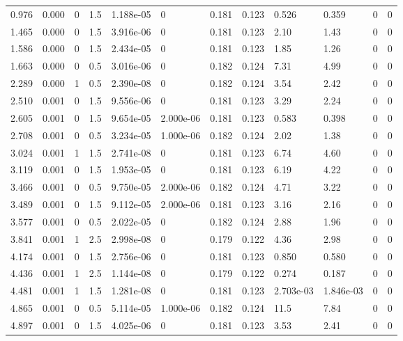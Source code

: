 \documentclass[preview]{standalone}
\begin{document}
{{\begin{tabular}{L{1.2cm}C{1.2cm} C{0.3cm}C{0.5cm} C{1.4cm}C{1.4cm} C{1.4cm}C{1.4cm} C{1.6cm}C{1.6cm} C{1.6cm}C{1.6cm}}
  0.976  &  0.000  & 0     & 1.5 &  1.188e-05  & 0  &  0.181&   0.123& 0.526 & 0.359   &  0 & 0  \\ 
  1.465  &  0.000  & 0     & 1.5 &  3.916e-06  & 0  &  0.181&   0.123& 2.10 & 1.43   &  0 & 0  \\ 
  1.586  &  0.000  & 0     & 1.5 &  2.434e-05  & 0  &  0.181&   0.123& 1.85 & 1.26   &  0 & 0  \\ 
  1.663  &  0.000  & 0     & 0.5 &  3.016e-06  & 0  &  0.182&   0.124& 7.31 & 4.99   &  0 & 0  \\ 
  2.289  &  0.000  & 1     & 0.5 &  2.390e-08  & 0  &  0.182&   0.124& 3.54 & 2.42   &  0 & 0  \\ 
  2.510  &  0.001  & 0     & 1.5 &  9.556e-06  & 0  &  0.181&   0.123& 3.29 & 2.24   &  0 & 0  \\ 
  2.605  &  0.001  & 0     & 1.5 &  9.654e-05  & 2.000e-06  &  0.181&   0.123& 0.583 & 0.398   &  0 & 0  \\ 
  2.708  &  0.001  & 0     & 0.5 &  3.234e-05  & 1.000e-06  &  0.182&   0.124& 2.02 & 1.38   &  0 & 0  \\ 
  3.024  &  0.001  & 1     & 1.5 &  2.741e-08  & 0  &  0.181&   0.123& 6.74 & 4.60   &  0 & 0  \\ 
  3.119  &  0.001  & 0     & 1.5 &  1.953e-05  & 0  &  0.181&   0.123& 6.19 & 4.22   &  0 & 0  \\ 
  3.466  &  0.001  & 0     & 0.5 &  9.750e-05  & 2.000e-06  &  0.182&   0.124& 4.71 & 3.22   &  0 & 0  \\ 
  3.489  &  0.001  & 0     & 1.5 &  9.112e-05  & 2.000e-06  &  0.181&   0.123& 3.16 & 2.16   &  0 & 0  \\ 
  3.577  &  0.001  & 0     & 0.5 &  2.022e-05  & 0  &  0.182&   0.124& 2.88 & 1.96   &  0 & 0  \\ 
  3.841  &  0.001  & 1     & 2.5 &  2.998e-08  & 0  &  0.179&   0.122& 4.36 & 2.98   &  0 & 0  \\ 
  4.174  &  0.001  & 0     & 1.5 &  2.756e-06  & 0  &  0.181&   0.123& 0.850 & 0.580   &  0 & 0  \\ 
  4.436  &  0.001  & 1     & 2.5 &  1.144e-08  & 0  &  0.179&   0.122& 0.274 & 0.187   &  0 & 0  \\ 
  4.481  &  0.001  & 1     & 1.5 &  1.281e-08  & 0  &  0.181&   0.123& 2.703e-03 & 1.846e-03   &  0 & 0  \\ 
  4.865  &  0.001  & 0     & 0.5 &  5.114e-05  & 1.000e-06  &  0.182&   0.124& 11.5 & 7.84   &  0 & 0  \\ 
  4.897  &  0.001  & 0     & 1.5 &  4.025e-06  & 0  &  0.181&   0.123& 3.53 & 2.41   &  0 & 0  \\ 

\end{tabular}}}
\end{document}
